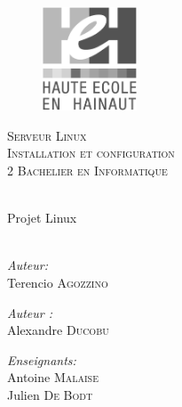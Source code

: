\begin{center}
  
  \begin{figure}[!h]
    \centering
    \includegraphics[width=0.25\textwidth]{textures/logo/heh_bw.eps}    
  \end{figure}

  \textsc{\LARGE Serveur Linux} \\ [0.5cm]
  \textsc{\Large Installation et configuration} \\ [0.5cm]

  \textsc{\large 2 Bachelier en Informatique} \\ [0.2cm]

  \begingroup
   \selectfont 

  \HRule \\ [0.4cm] {
    \huge Projet Linux \\ [0.2cm] 
  }
  \HRule \\ [1.3cm]
  \endgroup

  \begin{minipage}[t]{0.4 \textwidth} 
    \begin{flushleft} 
      \large \emph{Auteur:} \\ 
      Terencio \textsc{Agozzino}
    \end{flushleft} 
  \end{minipage}
  \begin{minipage}[t]{0.4 \textwidth}
    \begin{flushright} 
      \large \emph{Auteur :} \\ 
      Alexandre \textsc{Ducobu}
    \end{flushright} 
  \end{minipage}

  \vspace{1.5cm}

  \begin{minipage}[t]{0.4 \textwidth}
    \begin{center} 
      \large \emph{Enseignants:} \\ 
      Antoine \textsc{Malaise} \\
      Julien \textsc{De Bodt}
    \end{center} 
  \end{minipage}


\end{center}
